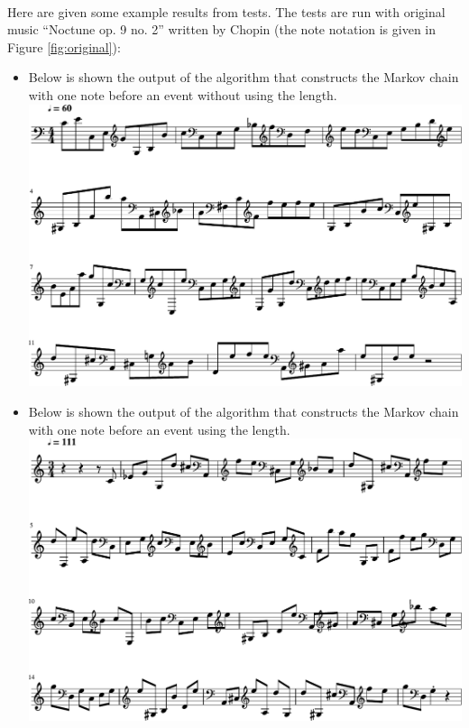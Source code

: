 \documentclass[]{article}
\begin{document}
        \paragraph{}Here are given some example results from tests. The tests are run with original music ``Noctune op. 9 no. 2'' written by Chopin (the note notation is given in Figure \ref{fig:original}):
        \begin{itemize}
            \item Below is shown the output of the algorithm that constructs the Markov chain with one note before an event without using the length.\\
            \includegraphics[scale=0.6]{result_one_note}
            \item Below is shown the output of the algorithm that constructs the Markov chain with one note before an event using the length.\\
            \includegraphics[scale=0.6]{result_one_note_time}

\end{itemize}
\end{document}
